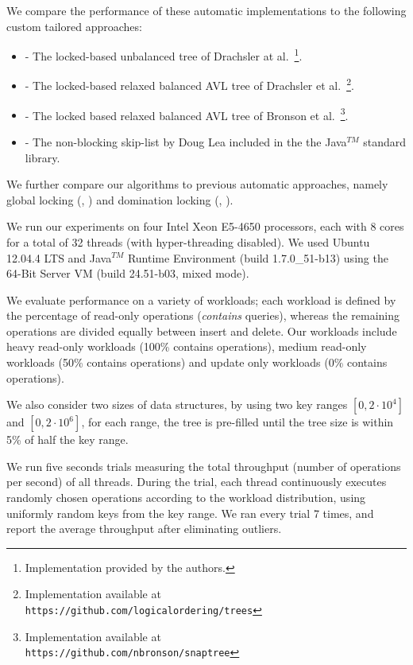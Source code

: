 We compare the performance of these  automatic implementations
to the following custom tailored approaches: 
\begin{itemize}
\item \danaTree - The locked-based 
				unbalanced tree of Drachsler at al.~\cite{DrachslerVY2014}\footnote{Implementation provided by the authors.}. 
\item \danaAVL - The locked-based relaxed balanced AVL tree of 
				Drachsler et al.~\cite{DrachslerVY2014}\footnote{Implementation available at \\
				\texttt{https://github.com/logicalordering/trees}}.
\item \bronson - The locked based relaxed balanced AVL tree
				of Bronson et al.~\cite{BronsonCCO2010}\footnote{Implementation available at \\
				\texttt{https://github.com/nbronson/snaptree}}.
\item \skiplist - The non-blocking skip-list by Doug 
				Lea included in the 
				the Java$^{TM}$ standard library.
\end{itemize}

We further compare our algorithms to previous automatic approaches, 
namely global locking (\globalTree, \globalTreap) 
and domination locking (\domTree, \domTreap). 

We run our experiments on four Intel Xeon E5-4650 processors, 
each with 8 cores for a total of 32 threads 
(with hyper-threading disabled). 
We used Ubuntu 12.04.4 LTS and Java$^{TM}$ Runtime Environment (build
1.7.0\_51-b13) using the 64-Bit Server VM (build 24.51-b03, mixed mode).


We evaluate performance on a variety of workloads;
each workload is defined by the percentage of read-only
operations (\emph{contains} queries), whereas the remaining operations 
are divided equally between insert and delete.
Our workloads include heavy read-only workloads
(100\% contains operations), medium read-only workloads 
(50\% contains operations) and update only workloads
(0\% contains operations). 

We also consider two sizes of data structures, by using two key ranges
$[0,2\cdot10^4]$ and $[0,2\cdot10^6]$, for each range, the tree is pre-filled until the tree size is 
within 5\% of half the key range.   

We run five seconds trials measuring the total throughput
(number of operations per second) of all threads.
During the trial, each thread continuously executes randomly
chosen operations according to the workload distribution, 
using uniformly random keys from the key range.  
We ran every trial 7 times, and report the average throughput
after eliminating outliers.

